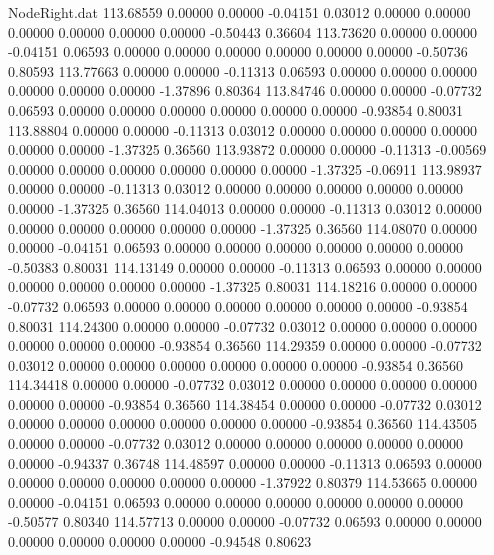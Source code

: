 \begin{filecontents}{NodeRight.dat}
 113.68559    0.00000    0.00000    -0.04151    0.03012    0.00000    0.00000    0.00000    0.00000    0.00000    0.00000   -0.50443    0.36604
 113.73620    0.00000    0.00000    -0.04151    0.06593    0.00000    0.00000    0.00000    0.00000    0.00000    0.00000   -0.50736    0.80593
 113.77663    0.00000    0.00000    -0.11313    0.06593    0.00000    0.00000    0.00000    0.00000    0.00000    0.00000   -1.37896    0.80364
 113.84746    0.00000    0.00000    -0.07732    0.06593    0.00000    0.00000    0.00000    0.00000    0.00000    0.00000   -0.93854    0.80031
 113.88804    0.00000    0.00000    -0.11313    0.03012    0.00000    0.00000    0.00000    0.00000    0.00000    0.00000   -1.37325    0.36560
 113.93872    0.00000    0.00000    -0.11313   -0.00569    0.00000    0.00000    0.00000    0.00000    0.00000    0.00000   -1.37325   -0.06911
 113.98937    0.00000    0.00000    -0.11313    0.03012    0.00000    0.00000    0.00000    0.00000    0.00000    0.00000   -1.37325    0.36560
 114.04013    0.00000    0.00000    -0.11313    0.03012    0.00000    0.00000    0.00000    0.00000    0.00000    0.00000   -1.37325    0.36560
 114.08070    0.00000    0.00000    -0.04151    0.06593    0.00000    0.00000    0.00000    0.00000    0.00000    0.00000   -0.50383    0.80031
 114.13149    0.00000    0.00000    -0.11313    0.06593    0.00000    0.00000    0.00000    0.00000    0.00000    0.00000   -1.37325    0.80031
 114.18216    0.00000    0.00000    -0.07732    0.06593    0.00000    0.00000    0.00000    0.00000    0.00000    0.00000   -0.93854    0.80031
 114.24300    0.00000    0.00000    -0.07732    0.03012    0.00000    0.00000    0.00000    0.00000    0.00000    0.00000   -0.93854    0.36560
 114.29359    0.00000    0.00000    -0.07732    0.03012    0.00000    0.00000    0.00000    0.00000    0.00000    0.00000   -0.93854    0.36560
 114.34418    0.00000    0.00000    -0.07732    0.03012    0.00000    0.00000    0.00000    0.00000    0.00000    0.00000   -0.93854    0.36560
 114.38454    0.00000    0.00000    -0.07732    0.03012    0.00000    0.00000    0.00000    0.00000    0.00000    0.00000   -0.93854    0.36560
 114.43505    0.00000    0.00000    -0.07732    0.03012    0.00000    0.00000    0.00000    0.00000    0.00000    0.00000   -0.94337    0.36748
 114.48597    0.00000    0.00000    -0.11313    0.06593    0.00000    0.00000    0.00000    0.00000    0.00000    0.00000   -1.37922    0.80379
 114.53665    0.00000    0.00000    -0.04151    0.06593    0.00000    0.00000    0.00000    0.00000    0.00000    0.00000   -0.50577    0.80340
 114.57713    0.00000    0.00000    -0.07732    0.06593    0.00000    0.00000    0.00000    0.00000    0.00000    0.00000   -0.94548    0.80623

\end{filecontents}
